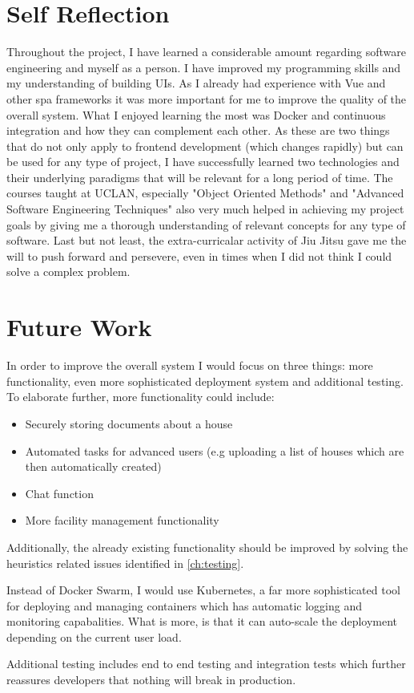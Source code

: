 \section{Self Reflection}
Throughout the project, I have learned a considerable amount regarding software engineering and myself as a person. I have improved my programming skills and my understanding of building UIs. As I already had experience with Vue and other \acrshort{spa} frameworks it was more important for me to improve the quality of the overall system. What I enjoyed learning the most was Docker and continuous integration and how they can complement each other. As these are two things that do not only apply to frontend development (which changes rapidly) but can be used for any type of project, I have successfully learned two technologies and their underlying paradigms that will be relevant for a long period of time. The courses taught at UCLAN, especially "Object Oriented Methods" and "Advanced Software Engineering Techniques" also very much helped in achieving my project goals by giving me a thorough understanding of relevant concepts for any type of software. Last but not least, the extra-curricalar activity of Jiu Jitsu gave me the will to push forward and persevere, even in times when I did not think I could solve a complex problem. 

\section{Future Work}
In order to improve the overall system I would focus on three things: more functionality, even more sophisticated deployment system and additional testing. To elaborate further, more functionality could include:

\begin{itemize}
    \item Securely storing documents about a house
    \item Automated tasks for advanced users (e.g uploading a list of houses which are then automatically created)
    \item Chat function
    \item More facility management functionality
\end{itemize}

Additionally, the already existing functionality should be improved by solving the heuristics related issues identified in \autoref{ch:testing}.

Instead of Docker Swarm, I would use Kubernetes, a far more sophisticated tool for deploying and managing containers which has automatic logging and monitoring capabalities. What is more, is that it can auto-scale the deployment depending on the current user load.  

Additional testing includes end to end testing and integration tests which further reassures developers that nothing will break in production.